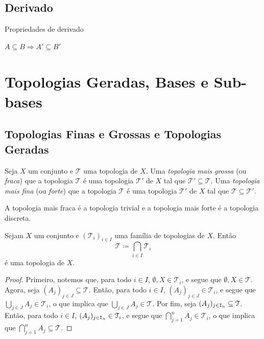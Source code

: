 \section{Derivado}

Propriedades de derivado

$A \subseteq B \Rightarrow A' \subseteq B'$


\chapter{Topologias Geradas, Bases e Sub-bases}

\section{Topologias Finas e Grossas e Topologias Geradas}

\begin{defi}
	Seja $X$ um conjunto e $\mathcal T$ uma topologia de $X$. Uma \emph{topologia mais grossa} (ou \emph{fraca}) que a topologia $\mathcal T$ é uma topologia $\mathcal T'$ de $X$ tal que $\mathcal T' \subseteq \mathcal T$. Uma \emph{topologia mais fina} (ou \emph{forte}) que a topologia $\mathcal T$ é uma topologia $\mathcal T'$ de $X$ tal que $\mathcal T \subseteq \mathcal T'$.
\end{defi}

	A topologia mais fraca é a topologia trivial e a topologia mais forte é a topologia discreta.

\begin{prop}
	Sejam $X$ um conjunto e $(\mathcal T_i)_{i \in I}$ uma família de topologias de $X$. Então
	\begin{equation*}
	\mathcal T \coloneqq \bigcap_{i \in I} \mathcal T_i
	\end{equation*}
é uma topologia de $X$.
\end{prop}
\begin{proof}
	Primeiro, notemos que, para todo $i \in I$, $\emptyset,X \in \mathcal T_i$, e segue que $\emptyset,X \in \mathcal T$. Agora, seja $(A_j)_{j \in J} \subseteq \mathcal T$.  Então, para todo $i \in I$, $(A_j)_{j \in J} \in \mathcal T_i$, e segue que $\bigcup_{j \in J} A_j \in \mathcal T_i$, o que implica que $\bigcup_{j \in J} A_j \in \mathcal T$. Por fim, seja $(A_j)_{j \in \mathtt I_n} \subseteq \mathcal T$. Então, para todo $i \in I$, $(A_j)_{j \in \mathtt I_n} \in \mathcal T_i$, e segue que $\bigcap_{j=1}^n A_j \in \mathcal T_i$, o que implica que $\bigcap_{j=1}^n A_j \subseteq \mathcal T$.
\end{proof}


